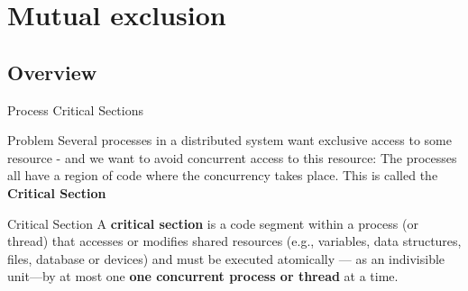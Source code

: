 %     
%     
\section{Mutual exclusion}
\subsection{Overview}
\begin{frame}[fragile]{Process Critical Sections}
  \begin{alertblock}{Problem}
    Several processes in a distributed system want exclusive access to
    some resource - and we want to avoid concurrent access to this
    resource: The processes all have a region of code
    where the concurrency takes place. This is called the
    \textbf{Critical Section}
  \end{alertblock}
  \begin{block}{Critical Section}
    A \textbf{critical section} is a code segment within a process (or thread)
    that accesses or modifies shared resources (e.g., variables, data structures,
    files, database or devices) and must be executed atomically — as an indivisible
    unit—by at most one \textbf{one concurrent process or thread} at a time.
  \end{block}
\end{frame}


